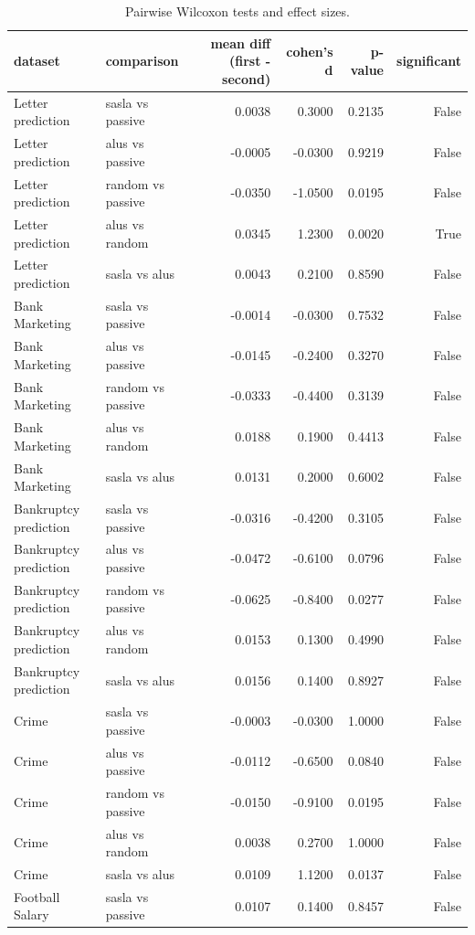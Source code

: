 \begin{table}
\caption{Pairwise Wilcoxon tests and effect sizes.}
\label{tab:significance}
\begin{tabular}{llrrrr}
\toprule
dataset & comparison & mean diff (first - second) & cohen's d & p-value & significant \\
\midrule
Letter prediction & sasla vs passive & 0.0038 & 0.3000 & 0.2135 & False \\
Letter prediction & alus vs passive & -0.0005 & -0.0300 & 0.9219 & False \\
Letter prediction & random vs passive & -0.0350 & -1.0500 & 0.0195 & False \\
Letter prediction & alus vs random & 0.0345 & 1.2300 & 0.0020 & True \\
Letter prediction & sasla vs alus & 0.0043 & 0.2100 & 0.8590 & False \\
Bank Marketing & sasla vs passive & -0.0014 & -0.0300 & 0.7532 & False \\
Bank Marketing & alus vs passive & -0.0145 & -0.2400 & 0.3270 & False \\
Bank Marketing & random vs passive & -0.0333 & -0.4400 & 0.3139 & False \\
Bank Marketing & alus vs random & 0.0188 & 0.1900 & 0.4413 & False \\
Bank Marketing & sasla vs alus & 0.0131 & 0.2000 & 0.6002 & False \\
Bankruptcy prediction & sasla vs passive & -0.0316 & -0.4200 & 0.3105 & False \\
Bankruptcy prediction & alus vs passive & -0.0472 & -0.6100 & 0.0796 & False \\
Bankruptcy prediction & random vs passive & -0.0625 & -0.8400 & 0.0277 & False \\
Bankruptcy prediction & alus vs random & 0.0153 & 0.1300 & 0.4990 & False \\
Bankruptcy prediction & sasla vs alus & 0.0156 & 0.1400 & 0.8927 & False \\
Crime & sasla vs passive & -0.0003 & -0.0300 & 1.0000 & False \\
Crime & alus vs passive & -0.0112 & -0.6500 & 0.0840 & False \\
Crime & random vs passive & -0.0150 & -0.9100 & 0.0195 & False \\
Crime & alus vs random & 0.0038 & 0.2700 & 1.0000 & False \\
Crime & sasla vs alus & 0.0109 & 1.1200 & 0.0137 & False \\
Football Salary & sasla vs passive & 0.0107 & 0.1400 & 0.8457 & False \\

\end{tabular}
\end{table}
